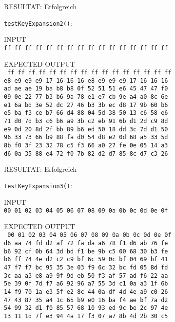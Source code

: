 \documentclass[12pt, letterpaper]{article}
\newcommand{\code}[1]{\texttt{#1}}
\begin{document}
RESULTAT: {\color{dgreen}Erfolgreich}

\code{testKeyExpansion2()}:

INPUT\\
\code{ff ff ff ff ff ff ff ff ff ff ff ff ff ff ff ff}

\newpage
EXPECTED OUTPUT\\
\code{
ff ff ff ff ff ff ff ff ff ff ff ff ff ff ff ff\\
e8 e9 e9 e9 17 16 16 16 e8 e9 e9 e9 17 16 16 16\\
ad ae ae 19 ba b8 b8 0f 52 51 51 e6 45 47 47 f0\\
09 0e 22 77 b3 b6 9a 78 e1 e7 cb 9e a4 a0 8c 6e\\
e1 6a bd 3e 52 dc 27 46 b3 3b ec d8 17 9b 60 b6\\
e5 ba f3 ce b7 66 d4 88 04 5d 38 50 13 c6 58 e6\\
71 d0 7d b3 c6 b6 a9 3b c2 eb 91 6b d1 2d c9 8d\\
e9 0d 20 8d 2f bb 89 b6 ed 50 18 dd 3c 7d d1 50\\
96 33 73 66 b9 88 fa d0 54 d8 e2 0d 68 a5 33 5d\\
8b f0 3f 23 32 78 c5 f3 66 a0 27 fe 0e 05 14 a3\\
d6 0a 35 88 e4 72 f0 7b 82 d2 d7 85 8c d7 c3 26
}

RESULTAT: {\color{dgreen}Erfolgreich}

\code{testKeyExpansion3()}:

INPUT\\
\code{00 01 02 03 04 05 06 07 08 09 0a 0b 0c 0d 0e 0f}

EXPECTED OUTPUT\\
\code{
00 01 02 03 04 05 06 07 08 09 0a 0b 0c 0d 0e 0f\\
d6 aa 74 fd d2 af 72 fa da a6 78 f1 d6 ab 76 fe\\
b6 92 cf 0b 64 3d bd f1 be 9b c5 00 68 30 b3 fe\\
b6 ff 74 4e d2 c2 c9 bf 6c 59 0c bf 04 69 bf 41\\
47 f7 f7 bc 95 35 3e 03 f9 6c 32 bc fd 05 8d fd\\
3c aa a3 e8 a9 9f 9d eb 50 f3 af 57 ad f6 22 aa\\
5e 39 0f 7d f7 a6 92 96 a7 55 3d c1 0a a3 1f 6b\\
14 f9 70 1a e3 5f e2 8c 44 0a df 4d 4e a9 c0 26\\
47 43 87 35 a4 1c 65 b9 e0 16 ba f4 ae bf 7a d2\\
54 99 32 d1 f0 85 57 68 10 93 ed 9c be 2c 97 4e\\
13 11 1d 7f e3 94 4a 17 f3 07 a7 8b 4d 2b 30 c5
}
\end{document}
